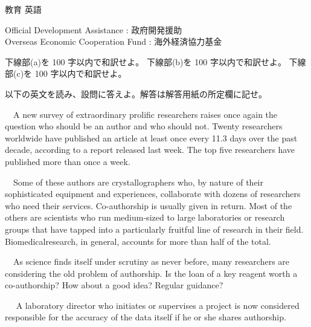 \documentclass[fleqn]{jbook}
\begin{document}
\begin{question}{教育 英語}{}
\begin{subquestions}
Official Development Assistance : 政府開発援助\\
Overseas Economic Cooperation Fund : 海外経済協力基金\\
\baselineskip=15pt

 \noindent {[設問]}
 \begin{subsubquestions}
 \SubSubQuestion
    下線部(a)を 100 字以内で和訳せよ。
 \SubSubQuestion
    下線部(b)を 100 字以内で和訳せよ。
 \SubSubQuestion
    下線部(c)を 100 字以内で和訳せよ。
 \end{subsubquestions}





\SubQuestion
   以下の英文を読み、設問に答えよ。解答は解答用紙の所定欄に記せ。
\baselineskip=12pt

    　A new survey of extraordinary prolific researchers raises once
   again the question who should be an author and who should not.
   Twenty researchers worldwide have published an article at least
   once every 11.3 days over the past decade, according to a report
   released last week. The top five researchers have published more
   than once a week.

   　Some of these authors are crystallographers who, by nature of
   their sophisticated equipment and experiences, collaborate with
   dozens of researchers who need their services. Co-authorship is
   usually given in return. Most of the others are scientists who run
   medium-sized to large laboratories or research groups that have
   tapped into a particularly fruitful line of research in their
   field.  Biomedicalresearch, in general,
   accounts for more than half of the total.

   　As science finds itself under scrutiny as never before, many
   researchers are considering the old problem of authorship. Is the
   loan of a key reagent worth a co-authorship? How about a good idea? 
   Regular guidance?

   　 A laboratory director who
   initiates or supervises a project is now considered responsible for
   the accuracy of the data itself if he or she shares authorship.


\end{subquestions}
\end{question}
\end{document}
